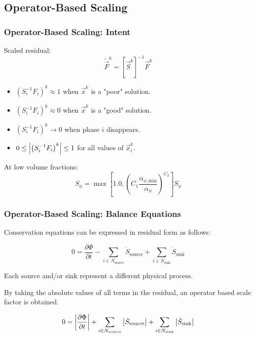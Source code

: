 \documentclass[compress,xcolor=table]{beamer}
\begin{document}
\subsection[Operator-Based Scaling]{Operator-Based Scaling}
\begin{frame}
\frametitle{Operator-Based Scaling: Intent}

Scaled residual:
\begin{equation*}
\tilde{\vec{F}}^{k} = \left[\vec{S}^{k}\right]^{-1}\vec{F}^{k}\end{equation*}

\begin{itemize}
\item{$\left( S_{i}^{-1} F_{i} \right)^{k} \approx 1$ when $\vec{x}^{k}$ is a "poor" solution.}
\item{$(S_{i}^{-1} F_i)^{k} \approx 0$ when $\vec{x}^{k}$ is a "good" solution.}
\item{$\left( S_{i}^{-1} F_{i} \right)^{k} \rightarrow 0$ when phase $i$ disappears.}
\item{$0 \leq \left| \left( S_{i}^{-1} F_{i} \right)^{k} \right| \leq 1 $ for all values of $\vec{x}^{k}_i$.}
\end{itemize}

At low volume fractions:
\begin{equation*}
S_{\phi} = \max[1.0, \left(C_{1}\frac{\alpha_{\phi,\text{min}}}{\alpha_{\phi}}\right)^{C_{2}} ] S_{\phi}
\end{equation*}

\end{frame}
\begin{frame}
\frametitle{Operator-Based Scaling: Balance Equations}
Conservation equations can be expressed in residual form as follows:

\begin{equation*}
0 = \frac{\partial \Phi}{\partial t} - \sum_{i \in N_{\text{source}}} \dot{S}_{\text{source}} + \sum_{i \in N_{\text{sink}}} \dot{S}_{\text{sink}}
\end{equation*}

Each source and/or sink represent a different physical process.

By taking the absolute values of all terms in the residual, an operator based scale factor is obtained.

\begin{equation*}
0 = \left|\frac{\partial \Phi}{\partial t}\right| + \sum_{i \in N_{\text{source}}} \left|\dot{S}_{\text{source}}\right| + \sum_{i \in N_{\text{sink}}} \left|\dot{S}_{\text{sink}}\right|
\end{equation*}


\end{frame}
\end{document}
